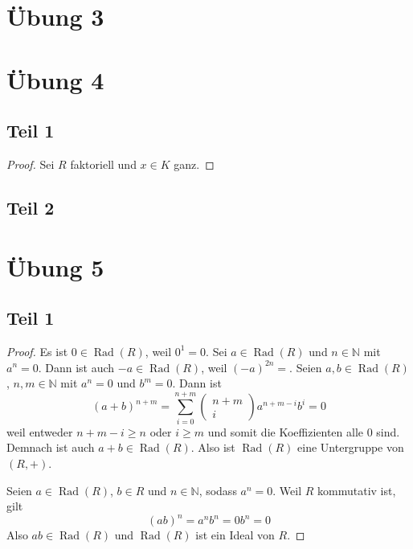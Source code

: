 \documentclass[10pt,a4paper]{article}
\DeclareMathOperator{\rad}{Rad}
\begin{document}
\section{Übung 3}

\section{Übung 4}

\subsection{Teil 1}

\begin{proof}
  Sei $R$ faktoriell und $x \in K$ ganz.

\end{proof}

\subsection{Teil 2}

\section{Übung 5}

\subsection{Teil 1}

\begin{proof}
  Es ist $0 \in \rad(R)$, weil $0^{1} = 0$.
  Sei $a \in \rad(R)$ und $n \in \mathbb{N}$ mit $a^{n} = 0$.
  Dann ist auch $-a \in \rad(R)$, weil $(-a)^{2n} = $.
  Seien $a, b \in \rad(R)$, $n, m \in \mathbb{N}$ mit $a^{n} = 0$ und $b^{m} = 0$.
  Dann ist
  \begin{equation}
    (a + b)^{n + m} = \sum_{i = 0}^{n + m} \begin{pmatrix}n + m\\i\end{pmatrix} a^{n + m - i}b^{i} = 0
  \end{equation}
  weil entweder $n + m - i \ge n$ oder $i \ge m$ und somit die Koeffizienten alle $0$ sind.
  Demnach ist auch $a + b \in \rad(R)$.
  Also ist $\rad(R)$ eine Untergruppe von $(R, +)$.

  Seien $a \in \rad(R)$, $b \in R$ und $n \in \mathbb{N}$, sodass $a^{n} = 0$.
  Weil $R$ kommutativ ist, gilt
  \begin{equation}
    (ab)^{n} = a^{n}b^{n} = 0b^{n} = 0
  \end{equation}
  Also $ab \in \rad(R)$ und $\rad(R)$ ist ein Ideal von $R$.
\end{proof}
\end{document}
